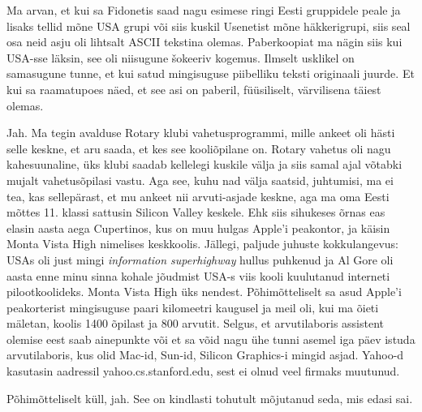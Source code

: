 
Ma arvan, et kui sa Fidonetis saad nagu esimese ringi Eesti gruppidele peale ja 
lisaks tellid  mõne USA grupi või siis kuskil Usenetist mõne häkkerigrupi, siis 
seal osa neid asju oli lihtsalt ASCII tekstina olemas. Paberkoopiat ma nägin 
siis kui USA-sse läksin, see oli  niisugune šokeeriv kogemus. Ilmselt usklikel 
on samasugune tunne, et kui satud mingisuguse piibelliku teksti originaali 
juurde. Et kui sa raamatupoes näed, et see asi on paberil, füüsiliselt, 
värvilisena täiest olemas. 


Jah. Ma tegin avalduse Rotary klubi vahetusprogrammi, mille 
ankeet oli hästi selle keskne, et aru saada, et kes see kooliõpilane on. Rotary 
vahetus oli nagu kahesuunaline, üks klubi saadab kellelegi kuskile välja ja 
siis samal ajal võtabki mujalt vahetusõpilasi vastu. Aga see, kuhu nad välja 
saatsid, juhtumisi, ma ei tea, kas sellepärast, et mu ankeet nii arvuti-asjade 
keskne, aga ma oma Eesti mõttes 11. klassi sattusin Silicon Valley keskele. Ehk 
siis sihukeses õrnas eas elasin aasta aega Cupertinos, kus on muu hulgas 
Apple'i peakontor, ja käisin Monta Vista High nimelises keskkoolis. Jällegi,  
paljude juhuste kokkulangevus: USAs oli just mingi \emph{information 
superhighway} hullus puhkenud ja Al Gore oli aasta enne 
minu sinna kohale jõudmist USA-s viis kooli kuulutanud  interneti 
pilootkoolideks. Monta Vista High üks nendest. Põhimõtteliselt sa asud 
Apple'i peakorterist mingisuguse paari kilomeetri kaugusel ja meil oli, kui ma 
õieti mäletan, koolis 1400 õpilast ja 800 arvutit. Selgus, et arvutilaboris 
assistent olemise eest saab ainepunkte või et sa võid nagu ühe tunni asemel iga 
päev istuda arvutilaboris, kus olid Mac-id, Sun-id, Silicon Graphics-i mingid 
asjad. Yahoo-d kasutasin aadressil yahoo.cs.stanford.edu, sest ei olnud veel 
firmaks muutunud.


Põhimõtteliselt küll, jah. See  on kindlasti tohutult mõjutanud seda, mis edasi 
sai. 



